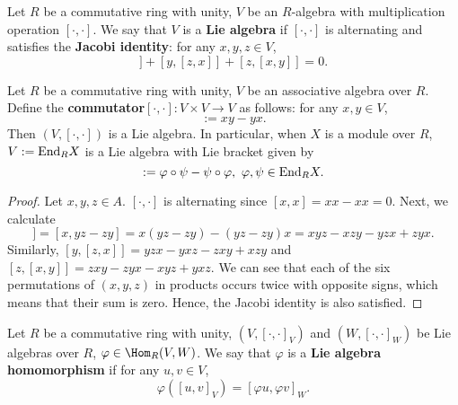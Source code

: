 \begin{definition}
  Let
    $R$ be a commutative ring with unity,
    $V$ be an $R$-algebra with multiplication operation $[\cdot, \cdot]$.
  We say that $V$ is a \textbf{Lie algebra} if $[\cdot, \cdot]$ is alternating
  and satisfies the \textbf{Jacobi identity}: for any $x, y, z \in V$,
  \begin{equation}
    [x, [y, z]] + [y, [z, x]] + [z, [x, y]] = 0.
  \end{equation}
\end{definition}
\begin{proposition}
  Let
    $R$ be a commutative ring with unity,
    $V$ be an associative algebra over $R$.
  Define the \textbf{commutator}$ [\cdot, \cdot] \colon V \times V \to V$
  as follows: for any $x, y \in V$,
  \begin{equation}
    [x, y] := x y - y x.
  \end{equation}
  Then $(V, [\cdot, \cdot])$ is a Lie algebra.
  In particular, when $X$ is a module over $R$, $V := {\rm End}_R X$ is a Lie
  algebra with Lie bracket given by
  \begin{equation}
    [\varphi, \psi] := \varphi \circ \psi - \psi \circ \varphi,\
    \varphi, \psi \in {\rm End}_R X.
  \end{equation}
\end{proposition}
\begin{proof}
  Let $x, y, z \in A$.
  $[\cdot, \cdot]$ is alternating since $[x, x] = x x - x x = 0$.
  Next, we calculate
  \begin{equation}
    [x, [y, z]]
    = [x, y z - z y]
    = x (y z - z y) - (y z - z y) x
    = x y z - x z y - y z x + z y x.
  \end{equation}
  Similarly,
  $[y, [z, x]] = y z x - y x z - z x y + x z y$ and
  $[z, [x, y]] = z x y - z y x - x y z + y x z$.
  We can see that each of the six permutations of $(x, y, z)$ in products occurs
  twice with opposite signs, which means that their sum is zero.
  Hence, the Jacobi identity is also satisfied.
\end{proof}
\begin{definition}
  Let
    $R$ be a commutative ring with unity,
    $(V, [\cdot, \cdot]_V)$ and
    $(W, [\cdot, \cdot]_W)$ be Lie algebras over $R$,
    $\varphi \in \Hom_R(V, W)$.
  We say that $\varphi$ is a \textbf{Lie algebra homomorphism}
  if for any $u, v \in V$,
  \begin{equation}
    \varphi([u, v]_V) = [\varphi u, \varphi v]_W.
  \end{equation}
\end{definition}
